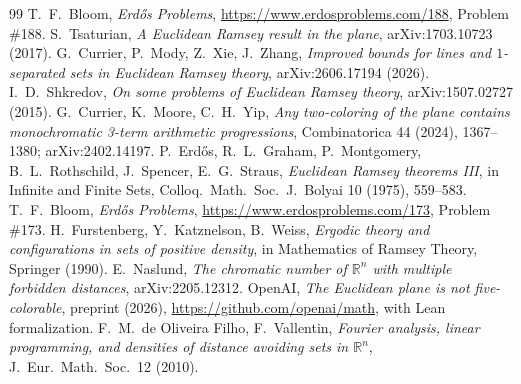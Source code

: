 \documentclass[11pt]{amsart}
\theoremstyle{definition}
\newcommand{\R}{\mathbb{R}}
\begin{document}
\begin{thebibliography}{99}
 T.~F.~Bloom, \emph{Erd\H{o}s Problems}, \url{https://www.erdosproblems.com/188}, Problem \#188.
 S.~Tsaturian, \emph{A Euclidean Ramsey result in the plane}, arXiv:1703.10723 (2017).
 G.~Currier, P.~Mody, Z.~Xie, J.~Zhang, \emph{Improved bounds for lines and $1$-separated sets in Euclidean Ramsey theory}, arXiv:2606.17194 (2026).
 I.~D.~Shkredov, \emph{On some problems of Euclidean Ramsey theory}, arXiv:1507.02727 (2015).
 G.~Currier, K.~Moore, C.~H.~Yip, \emph{Any two-coloring of the plane contains monochromatic 3-term arithmetic progressions}, Combinatorica 44 (2024), 1367--1380; arXiv:2402.14197.
 P.~Erd\H{o}s, R.~L.~Graham, P.~Montgomery, B.~L.~Rothschild, J.~Spencer, E.~G.~Straus, \emph{Euclidean Ramsey theorems III}, in Infinite and Finite Sets, Colloq.\ Math.\ Soc.\ J.\ Bolyai 10 (1975), 559--583.
 T.~F.~Bloom, \emph{Erd\H{o}s Problems}, \url{https://www.erdosproblems.com/173}, Problem \#173.
 H.~Furstenberg, Y.~Katznelson, B.~Weiss, \emph{Ergodic theory and configurations in sets of positive density}, in Mathematics of Ramsey Theory, Springer (1990).
 E.~Naslund, \emph{The chromatic number of $\R^n$ with multiple forbidden distances}, arXiv:2205.12312.
 OpenAI, \emph{The Euclidean plane is not five-colorable}, preprint (2026), \url{https://github.com/openai/math}, with Lean formalization.
 F.~M.~de Oliveira Filho, F.~Vallentin, \emph{Fourier analysis, linear programming, and densities of distance avoiding sets in $\R^n$}, J.\ Eur.\ Math.\ Soc.\ 12 (2010).
\end{thebibliography}
\end{document}
